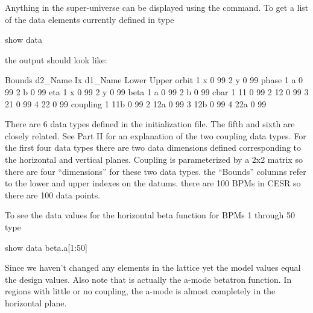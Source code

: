 Anything in the super-universe can be displayed using the 
command. To get a list of the data elements currently defined in \tao
type
\begin{example}
  show data
\end{example}
the output should look like:
\begin{example}
                                                              Bounds
     d2\_Name                       Ix  d1\_Name              Lower  Upper
     orbit
                                    1  x                      0    99
                                    2  y                      0    99
     phase
                                    1  a                      0    99
                                    2  b                      0    99
     eta
                                    1  x                      0    99
                                    2  y                      0    99
     beta
                                    1  a                      0    99
                                    2  b                      0    99
     cbar
                                    1  11                     0    99
                                    2  12                     0    99
                                    3  21                     0    99
                                    4  22                     0    99
     coupling
                                    1  11b                    0    99
                                    2  12a                    0    99
                                    3  12b                    0    99
                                    4  22a                    0    99

\end{example}
There are 6 data types defined in the initialization file. The fifth
and sixth are closely related. See Part II for an explanation of the
two coupling data types.  For the first four data types there are two
data dimensions defined corresponding to the horizontal and vertical
planes. Coupling is parameterized by a 2x2 matrix so there are four
``dimensions'' for these two data types. the ``Bounds'' columns refer
to the lower and upper indexes on the datums. there are 100 BPMs in
CESR so there are 100 data points.

To see the data values for the horizontal beta function for \cesr BPMs
1 through 50 type
\begin{example}
  show data beta.a[1:50]
\end{example}
Since we haven't changed any elements in the lattice yet the model
values equal the design values. Also note that  is actually
the a-mode betatron function. In regions with little or no coupling,
the a-mode is almost completely in the horizontal plane.

